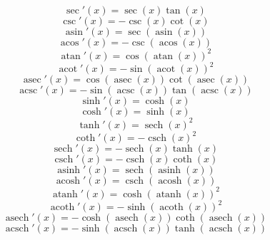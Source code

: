 \documentclass{article}
\DeclareMathOperator{\asin}{asin}
\DeclareMathOperator{\acos}{acos}
\DeclareMathOperator{\atan}{atan}
\DeclareMathOperator{\acot}{acot}
\DeclareMathOperator{\asec}{asec}
\DeclareMathOperator{\acsc}{acsc}
\DeclareMathOperator{\sech}{sech}
\DeclareMathOperator{\csch}{csch}
\DeclareMathOperator{\asinh}{asinh}
\DeclareMathOperator{\acosh}{acosh}
\DeclareMathOperator{\atanh}{atanh}
\DeclareMathOperator{\acoth}{acoth}
\DeclareMathOperator{\asech}{asech}
\DeclareMathOperator{\acsch}{acsch}
\begin{document}
    \begin{equation}
        \sec'(x)=\sec(x)\tan(x)
    \end{equation}
    \begin{equation}
        \csc'(x)=-\csc(x)\cot(x)
    \end{equation}
    \begin{equation}
        \asin'(x)=\sec(\asin(x))
    \end{equation}
    \begin{equation}
        \acos'(x)=-\csc(\acos(x))
    \end{equation}
    \begin{equation}
        \atan'(x)=\cos(\atan(x))^2
    \end{equation}
    \begin{equation}
        \acot'(x)=-\sin(\acot(x))^2
    \end{equation}
    \begin{equation}
        \asec'(x)=\cos(\asec(x))\cot(\asec(x))
    \end{equation}
    \begin{equation}
        \acsc'(x)=-\sin(\acsc(x))\tan(\acsc(x))
    \end{equation}
    \begin{equation}
        \sinh'(x)=\cosh(x)
    \end{equation}
    \begin{equation}
        \cosh'(x)=\sinh(x)
    \end{equation}
    \begin{equation}
        \tanh'(x)=\sech(x)^2
    \end{equation}
    \begin{equation}
        \coth'(x)=-\csch(x)^2
    \end{equation}
    \begin{equation}
        \sech'(x)=-\sech(x)\tanh(x)
    \end{equation}
    \begin{equation}
        \csch'(x)=-\csch(x)\coth(x)
    \end{equation}
    \begin{equation}
        \asinh'(x)=\sech(\asinh(x))
    \end{equation}
    \begin{equation}
        \acosh'(x)=\csch(\acosh(x))
    \end{equation}
    \begin{equation}
        \atanh'(x)=\cosh(\atanh(x))^2
    \end{equation}
    \begin{equation}
        \acoth'(x)=-\sinh(\acoth(x))^2
    \end{equation}
    \begin{equation}
        \asech'(x)=-\cosh(\asech(x))\coth(\asech(x))
    \end{equation}
    \begin{equation}
        \acsch'(x)=-\sinh(\acsch(x))\tanh(\acsch(x))
    \end{equation}
\end{document}
